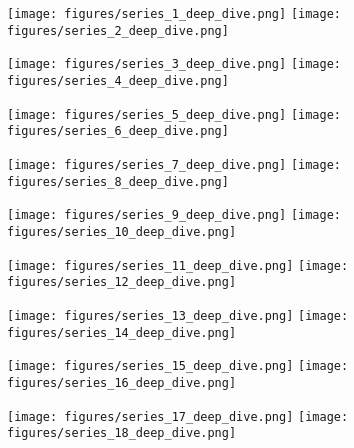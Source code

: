 \documentclass[10pt,letterpaper]{article}
\begin{document}
\begin{figure}[!h]
\centering
\texttt{[image: figures/series\_1\_deep\_dive.png]}
\texttt{[image: figures/series\_2\_deep\_dive.png]}
\end{figure}
\FloatBarrier
\clearpage

\begin{figure}[!h]
\centering
\texttt{[image: figures/series\_3\_deep\_dive.png]}
\texttt{[image: figures/series\_4\_deep\_dive.png]}
\end{figure}
\FloatBarrier
\clearpage

\begin{figure}[!h]
\centering
\texttt{[image: figures/series\_5\_deep\_dive.png]}
\texttt{[image: figures/series\_6\_deep\_dive.png]}
\end{figure}
\FloatBarrier
\clearpage

\begin{figure}[!h]
\centering
\texttt{[image: figures/series\_7\_deep\_dive.png]}
\texttt{[image: figures/series\_8\_deep\_dive.png]}
\end{figure}
\FloatBarrier
\clearpage

\begin{figure}[!h]
\centering
\texttt{[image: figures/series\_9\_deep\_dive.png]}
\texttt{[image: figures/series\_10\_deep\_dive.png]}
\end{figure}
\FloatBarrier
\clearpage

\begin{figure}[!h]
\centering
\texttt{[image: figures/series\_11\_deep\_dive.png]}
\texttt{[image: figures/series\_12\_deep\_dive.png]}
\end{figure}
\FloatBarrier
\clearpage

\begin{figure}[!h]
\centering
\texttt{[image: figures/series\_13\_deep\_dive.png]}
\texttt{[image: figures/series\_14\_deep\_dive.png]}
\end{figure}
\FloatBarrier
\clearpage

\begin{figure}[!h]
\centering
\texttt{[image: figures/series\_15\_deep\_dive.png]}
\texttt{[image: figures/series\_16\_deep\_dive.png]}
\end{figure}
\FloatBarrier
\clearpage

\begin{figure}[!h]
\centering
\texttt{[image: figures/series\_17\_deep\_dive.png]}
\texttt{[image: figures/series\_18\_deep\_dive.png]}
\end{figure}
\FloatBarrier
\clearpage
\end{document}
